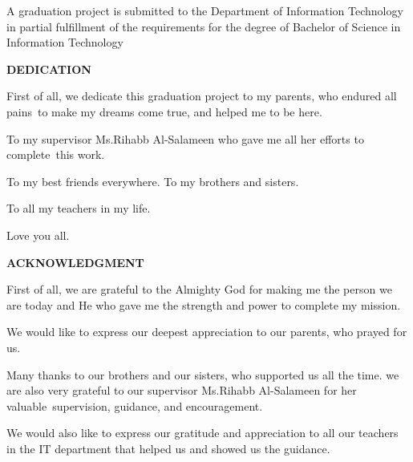 \documentclass[12pt]{article}
\begin{document}
	\begin{center}
	\vspace*{1cm}A graduation project is submitted to the Department of Information Technology in partial fulfillment of the requirements for the degree of Bachelor of Science in Information Technology \vspace{0.2cm}
	\end{center}
	\begin{center}
		\date{\today}
		\newpage
	\end{center}
	\begin{center}
		\textbf{DEDICATION}\\
		\begin{center}
		\end{center}
		First of all, we dedicate this graduation project to my parents, who endured all pains to make my dreams come true, and helped me to be here.
		
		To my supervisor Ms.Rihabb Al-Salameen who gave me all her efforts to complete this work.
		
		To my best friends everywhere. To my brothers and sisters.
		
		To all my teachers in my life.
		
		Love you all.
	\end{center}
	\newpage
	\begin{center}
		\textbf{ACKNOWLEDGMENT}\\
		\begin{center}
		\end{center}
		First of all, we are grateful to the Almighty God for making me the person we are today and He who gave me the strength and power to complete my mission.
		
		We would like to express our deepest appreciation to our parents, who prayed for us.
		
		Many thanks to our brothers and our sisters, who supported us all the time.
		we are also very grateful to our supervisor Ms.Rihabb Al-Salameen for her valuable supervision, guidance, and encouragement.
		
		We would also like to express our gratitude and appreciation to all our teachers in the IT department that helped us and showed us the guidance.
		
	\end{center}
	\newpage
\end{document}
